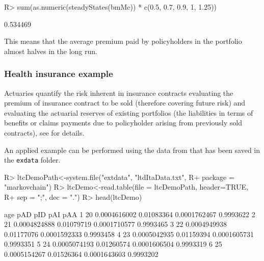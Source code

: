 \documentclass[article,nojss]{jss}
\begin{document}
\begin{CodeChunk}

\begin{CodeInput}
R> sum(as.numeric(steadyStates(bmMc)) * c(0.5, 0.7, 0.9, 1, 1.25))
\end{CodeInput}

\begin{CodeOutput}
[1] 0.534469
\end{CodeOutput}
\end{CodeChunk}

This means that the average premium paid by policyholders in the portfolio almost halves in the long run.

\hypertarget{sec:hi}{%
\subsubsection{Health insurance example}\label{sec:hi}}

Actuaries quantify the risk inherent in insurance contracts evaluating the premium of insurance contract to be sold (therefore covering future risk) and evaluating the actuarial reserves of existing portfolios (the liabilities in terms of benefits or claims payments due to policyholder arising from previously sold contracts), see \cite{deshmukh2012multiple} for details.

An applied example can be performed using the data from \cite{de2016assicurazioni} that has been saved in the \texttt{exdata} folder.

\begin{CodeChunk}

\begin{CodeInput}
R> ltcDemoPath<-system.file("extdata", "ltdItaData.txt", 
R+                          package = "markovchain")
R> ltcDemo<-read.table(file = ltcDemoPath, header=TRUE, 
R+                     sep = ";", dec = ".")
R> head(ltcDemo)
\end{CodeInput}

\begin{CodeOutput}
  age          pAD        pID          pAI       pAA
1  20 0.0004616002 0.01083364 0.0001762467 0.9993622
2  21 0.0004824888 0.01079719 0.0001710577 0.9993465
3  22 0.0004949938 0.01177076 0.0001592333 0.9993458
4  23 0.0005042935 0.01159394 0.0001605731 0.9993351
5  24 0.0005074193 0.01260574 0.0001606504 0.9993319
6  25 0.0005154267 0.01526364 0.0001643603 0.9993202
\end{CodeOutput}
\end{CodeChunk}
\end{document}
